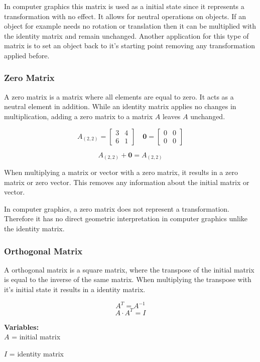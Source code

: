 In computer graphics this matrix is used as a initial state since it represents a transformation with no effect. It allows for neutral operations on objects. If an object for example needs no rotation or translation then it can be multiplied with the identity matrix and remain unchanged. Another application for this type of matrix is to set an object back to it's starting point removing any transformation applied before.


\subsubsection{Zero Matrix}
A zero matrix is a matrix where all elements are equal to zero. It acts as a neutral element in addition. While an identity matrix applies no changes in multiplication, adding a zero matrix to a matrix $A$ leaves $A$ unchanged.\ \cite{Web:21}

\[
A_{(2,2)} = 
\begin{bmatrix}
3 & 4 \\
6 & 1
\end{bmatrix} \quad
\mathbf{0} = 
\begin{bmatrix}
0 & 0 \\
0 & 0
\end{bmatrix}
\]

\[
A_{(2,2)} + \mathbf{0} = A_{(2,2)}
\]

When multiplying a matrix or vector with a zero matrix, it results in a zero matrix or zero vector. This removes any information about the initial matrix or vector.

In computer graphics, a zero matrix does not represent a transformation. Therefore it has no direct geometric interpretation in computer graphics unlike the identity matrix.


\subsubsection{Orthogonal Matrix}
A orthogonal matrix is a square matrix, where the transpose of the initial matrix is equal to the inverse of the same matrix. When multiplying the transpose with it's initial state it results in a identity matrix.\ \cite{Web:22}

\[
A^T = A^{-1} 
\]
\[
A \cdot A^T = I
\]

\textbf{Variables: } \\
$A$ = initial matrix

$I$ = identity matrix \\

